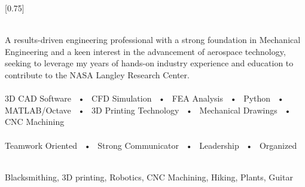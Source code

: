 \documentclass[allblack]{simplehipstercv}
\begin{document}
\setlength{\columnsep}{2cm}
[0.75]
\begin{paracol}{2}


\paracolbackgroundoptions


\footnotesize
{\setasidefontcolour
\flushleft
{}\\[0.5em]
    {\footnotesize
    A results-driven engineering
    professional with a strong
    foundation in Mechanical Engineering
    and a keen interest in the
    advancement of aerospace technology,
    seeking to leverage my years of
    hands-on industry experience and
    education to contribute to the NASA Langley Research Center.}\\
\bigskip
{} \\[0.5em]

    3D CAD Software ~•~ CFD Simulation ~•~ FEA Analysis ~•~ Python ~•~ MATLAB/Octave ~•~ 3D Printing Technology ~•~ Mechanical Drawings ~•~ CNC Machining\\

\bigskip
{} \\[0.5em]

    Teamwork Oriented ~•~ Strong Communicator ~•~ Leadership ~•~ Organized \\

\bigskip

\\[0.5em]

Blacksmithing, 3D printing, Robotics, CNC Machining,
Hiking, Plants, Guitar\\
\bigskip


}
\switchcolumn

\end{paracol}
\end{document}
